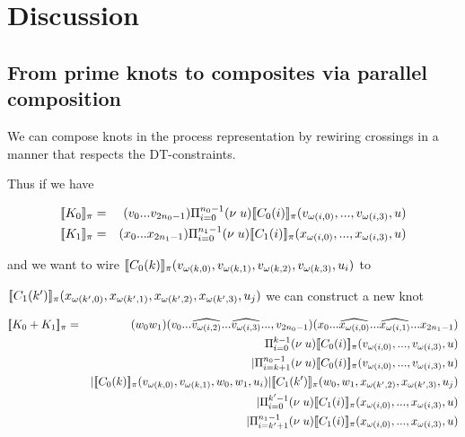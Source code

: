 \documentclass[]{llncs}
\begin{document}
\section{Discussion}

\subsection{From prime knots to composites via parallel composition}

We can compose knots in the process representation by rewiring
crossings in a manner that respects the DT-constraints. 

Thus if we have

\begin{eqnarray}
  \meaningof{K_0}_{\pi} & = & (v_0 ... v_{2n_{0}-1}) \Pi_{i = 0}^{n_{0}-1} (\nu \; u)\meaningof{C_0(i)}_{\pi}(v_{\omega(i,0)},...,v_{\omega(i,3)},u) \\
  \meaningof{K_1}_{\pi} & = & (x_0 ... x_{2n_{1}-1}) \Pi_{i = 0}^{n_{1}-1} (\nu \; u)\meaningof{C_1(i)}_{\pi}(x_{\omega(i,0)},...,x_{\omega(i,3)},u)
\end{eqnarray}

and we want to wire
$[\![ C_0(k) ]\!]_{\pi}(v_{\omega(k,0)},v_{\omega(k,1)},v_{\omega(k,2)},v_{\omega(k,3)},u_i)$
to


$[\![ C_1(k') ]\!]_{\pi}(x_{\omega(k',0)},x_{\omega(k',1)},x_{\omega(k',2)},x_{\omega(k',3)},u_j)$
we can construct a new knot

\begin{eqnarray} \label{knotcomp}
  \meaningof{K_0 + K_1}_{\pi} & = & ( w_0 w_1)( v_0 ... \widehat{v_{\omega(i,2)}} ... \widehat{v_{\omega(i,3)}} ..., v_{2n_{0}-1})( x_0 ... \widehat{x_{\omega(i,0)}} ... \widehat{x_{\omega(i,1)}} ... x_{2n_{1}-1}) \nonumber \\
  & & \Pi_{i = 0}^{k-1} (\nu \; u)\meaningof{C_0(i)}_{\pi}(v_{\omega(i,0)},...,v_{\omega(i,3)},u) \nonumber \\
  & & | \Pi_{i = k+1}^{n_{0}-1} (\nu \; u)\meaningof{C_0(i)}_{\pi}(v_{\omega(i,0)},...,v_{\omega(i,3)},u) \nonumber \\
  & & | \meaningof{C_0(k)}_{\pi}(v_{\omega(k,0)},v_{\omega(k,1)},w_0,w_1,u_i) | \meaningof{C_1(k')}_{\pi}(w_0,w_1,x_{\omega(k',2)},x_{\omega(k',3)},u_j) \nonumber \\
  & & | \Pi_{i = 0}^{k'-1} (\nu \; u)\meaningof{C_1(i)}_{\pi}(x_{\omega(i,0)},...,x_{\omega(i,3)},u) \nonumber \\
  & & | \Pi_{i = k'+1}^{n_{1}-1} (\nu \; u)\meaningof{C_1(i)}_{\pi}(x_{\omega(i,0)},...,x_{\omega(i,3)},u)
\end{eqnarray}
\end{document}

